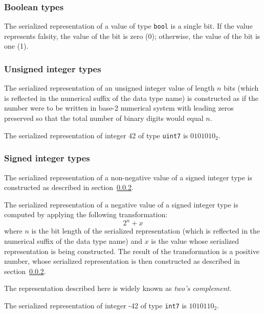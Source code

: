 \subsubsection{Boolean types}\label{sec:dsdl_serialized_bool}

The serialized representation of a value of type \verb|bool| is a single bit.
If the value represents falsity, the value of the bit is zero (0); otherwise, the value of the bit is one (1).

\subsubsection{Unsigned integer types}\label{sec:dsdl_serialized_unsigned_integer}

The serialized representation of an unsigned integer value of length $n$ bits
(which is reflected in the numerical suffix of the data type name)
is constructed as if the number were to be written in base-2 numerical system
with leading zeros preserved so that the total number of binary digits would equal $n$.

\begin{remark}
    The serialized representation of integer 42 of type \verb|uint7| is $0101010_2$.
\end{remark}

\subsubsection{Signed integer types}

The serialized representation of a non-negative value of a signed integer type is constructed as described
in section~\ref{sec:dsdl_serialized_unsigned_integer}.

The serialized representation of a negative value of a signed integer type is computed by
applying the following transformation:
$$2^n + x$$
where $n$ is the bit length of the serialized representation
(which is reflected in the numerical suffix of the data type name)
and $x$ is the value whose serialized representation is being constructed.
The result of the transformation is a positive number,
whose serialized representation is then constructed as described in section~\ref{sec:dsdl_serialized_unsigned_integer}.

The representation described here is widely known as \emph{two's complement}.

\begin{remark}
    The serialized representation of integer -42 of type \verb|int7| is $1010110_2$.
\end{remark}

